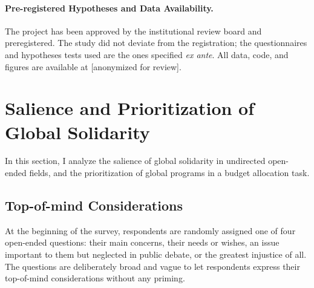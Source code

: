 \documentclass[12pt,english]{article}
\begin{document}
\begin{bibunit}
\paragraph{Pre-registered Hypotheses and Data Availability.}
The project has been approved by the institutional review board and preregistered. %
The study did not deviate from the registration; the questionnaires and hypotheses tests used are the ones specified \textit{ex ante}. All data, code, and figures are available at [anonymized for review].

\section{Salience and Prioritization of Global Solidarity\label{sec:salience}}

In this section, I analyze the salience of global solidarity in undirected open-ended fields, and the prioritization of global programs in a budget allocation task.

\subsection{Top-of-mind Considerations}\label{subsec:considerations}

At the beginning of the survey, respondents are randomly assigned one of four open-ended questions: their main concerns, their needs or wishes, an issue important to them but neglected in public debate, or the greatest injustice of all. The questions are deliberately broad and vague to let respondents express their top-of-mind considerations without any priming.


\end{bibunit}
\end{document}

